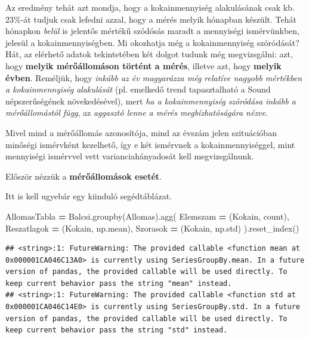 \documentclass[
]{book}
\newenvironment{Shaded}{\begin{snugshade}}{\end{snugshade}}
\newcommand{\NormalTok}[1]{#1}
\newcommand{\OperatorTok}[1]{\textcolor[rgb]{0.81,0.36,0.00}{\textbf{#1}}}
\newcommand{\StringTok}[1]{\textcolor[rgb]{0.31,0.60,0.02}{#1}}
\begin{document}
Az eredmény tehát azt mondja, hogy a kokainmennyiség alakulásának csak kb. \(23\%\)-át tudjuk csak lefedni azzal, hogy a mérés melyik hónapban készült. Tehát hónapkon \emph{belül} is jelentős mértékű szódósás maradt a mennyiségi ismérvünkben, jelesül a kokainmennyiségben.
Mi okozhatja még a kokainmennyiség szóródását? Hát, az elérhető adatok tekintetében két dolgot tudunk még megvizsgálni: azt, hogy \textbf{melyik mérőállomáson történt a mérés}, illetve azt, hogy \textbf{melyik évben}. Reméljük, hogy \emph{inkább az év magyarázza még relatíve nagyobb mértékben a kokainmennyiség alakulását} (pl. emelkedő trend tapasztalható a Sound népszerűségének növekedésével), mert \emph{ha a kokainmennyiség szóródása inkább a mérőállomástól függ}, az \emph{aggasztó lenne a mérés megbízhatóságára nézve}.

Mivel mind a mérőállomás azonosítója, mind az évszám jelen szituációban minőségi ismérvként kezelhető, így e két ismérvnek a kokainmennyiséggel, mint mennyiségi ismérvvel vett varianciahányadosát kell megvizsgálnunk.

Először nézzük a \textbf{mérőállomások esetét}.

Itt is kell ugyebár egy kiinduló segédtáblázat.

\begin{Shaded}
\begin{Highlighting}[]
\NormalTok{AllomasTabla }\OperatorTok{=}\NormalTok{ Balcsi.groupby(}\StringTok{\textquotesingle{}Allomas\textquotesingle{}}\NormalTok{).agg(}
\NormalTok{  Elemszam }\OperatorTok{=}\NormalTok{ (}\StringTok{\textquotesingle{}Kokain\textquotesingle{}}\NormalTok{, }\StringTok{\textquotesingle{}count\textquotesingle{}}\NormalTok{),}
\NormalTok{  Reszatlagok }\OperatorTok{=}\NormalTok{ (}\StringTok{\textquotesingle{}Kokain\textquotesingle{}}\NormalTok{, np.mean),}
\NormalTok{  Szorasok }\OperatorTok{=}\NormalTok{ (}\StringTok{\textquotesingle{}Kokain\textquotesingle{}}\NormalTok{, np.std)}
\NormalTok{).reset\_index()}
\end{Highlighting}
\end{Shaded}

\begin{verbatim}
## <string>:1: FutureWarning: The provided callable <function mean at 0x000001CA046C13A0> is currently using SeriesGroupBy.mean. In a future version of pandas, the provided callable will be used directly. To keep current behavior pass the string "mean" instead.
## <string>:1: FutureWarning: The provided callable <function std at 0x000001CA046C14E0> is currently using SeriesGroupBy.std. In a future version of pandas, the provided callable will be used directly. To keep current behavior pass the string "std" instead.
\end{verbatim}
\end{document}
